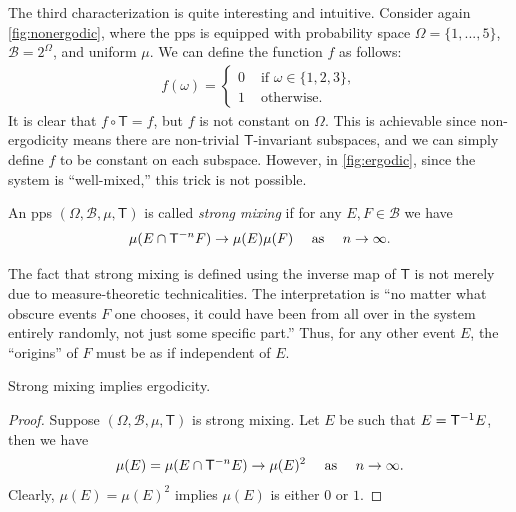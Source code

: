 \documentclass[a4paper]{article}
\begin{document}
\begin{remark}
	The third characterization is quite interesting and intuitive.
	Consider again \autoref{fig:nonergodic},
	where the \gls{pps} is equipped with probability space $\Omega=\{1,...,5\}$, $\mathcal{B}=2^\Omega$, and uniform $\mu$.
	We can define the function $f$ as follows:
	\begin{align*}
		f(\omega) =
		\begin{cases}
			0 & \text{ if } \omega \in \{1,2,3\}, \\
			1 & \text{ otherwise.}
		\end{cases}
	\end{align*}
	It is clear that $f\circ\mathsf{T}=f$, but $f$ is not constant on $\Omega$.
	This is achievable since non-ergodicity means there are non-trivial $\mathsf{T}$-invariant subspaces,
	and we can simply define $f$ to be constant on each subspace.
	However, in \autoref{fig:ergodic}, since the system is ``well-mixed,''
	this trick is not possible.
\end{remark}

\begin{definition}
	An \gls{pps} $(\Omega,\mathcal{B},\mu,\mathsf{T})$ is called \emph{strong mixing}
	if for any $E,F\in\mathcal{B}$ we have
	\begin{align*}
		\mu(E\cap\mathsf{T}\inv[n]F) \to \mu(E) \mu(F) \quad \text{ as } \quad n\to\infty.
	\end{align*}
\end{definition}

\begin{remark}
	The fact that strong mixing is defined using the inverse map of $\mathsf{T}$ is not merely due to measure-theoretic technicalities.
	The interpretation is ``no matter what obscure events $F$ one chooses,
	it could have been from all over in the system entirely randomly,
	not just some specific part.''
	Thus, for any other event $E$, the ``origins'' of $F$ must be as if independent of $E$.
\end{remark}

\begin{lemma}
	Strong mixing implies ergodicity.
\end{lemma}
\begin{proof}
	Suppose $(\Omega,\mathcal{B},\mu,\mathsf{T})$ is strong mixing.
	Let $E$ be such that $E=\mathsf{T}\inv E$, then we have
	\begin{align*}
		\mu(E) = \mu(E\cap\mathsf{T}\inv[n]E) \to \mu(E)^2 \quad \text{ as } \quad n\to\infty.
	\end{align*}
	Clearly, $\mu(E)=\mu(E)^2$ implies $\mu(E)$ is either $0$ or $1$.
\end{proof}
\end{document}
